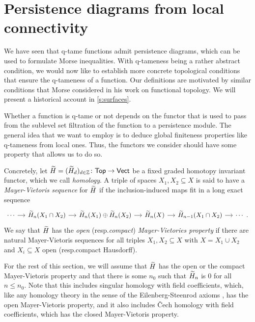 
\section{Persistence diagrams from local connectivity} \label{s:connectivity}

We have seen that q-tame functions admit persistence diagrams, which can be used to formulate Morse inequalities. With q-tameness being a rather abstract condition, we would now like to establish more concrete topological conditions that ensure the q-tameness of a function. Our definitions are motivated by similar conditions that Morse considered in his work on functional topology. We will present a historical account in \cref{s:surfaces}.

Whether a function is q-tame or not depends on the functor that is used to pass from the sublevel set filtration of the function to a persistence module. The general idea that we want to employ is to deduce global finiteness properties like q-tameness from local ones. Thus, the functors we consider should have some property that allows us to do so.

Concretely, let $\widetilde{H} = (\widetilde{H}_d)_{d \in \mathbb{Z}} \colon \mathsf{Top} \to \mathsf{Vect}$ be a fixed graded homotopy invariant functor, which we call \emph{homology}.
A triple of spaces $X_{1}, X_{2} \subseteq X$ is said to have a \emph{Mayer-Vietoris sequence} for $\widetilde{H}$ if the inclusion-induced maps fit in a long exact sequence
 \[
\begin{tikzcd}[column sep = small]
\cdots \arrow[r] & \H_{n}(X_{1} \cap X_{2}) \arrow[r] & \H_{n}(X_{1}) \oplus \H_{n}(X_{2}) \arrow[r] & \H_{n}(X) \arrow[r] & \H_{n-1}(X_{1} \cap X_{2}) \arrow[r] & \cdots \ .
\end{tikzcd}
\]
We say that $\widetilde{H}$ has the \emph{open} (resp.\@ \emph{compact}) \emph{Mayer-Vietories property} if there are natural Mayer-Vietoris sequences for all triples $X_{1}, X_{2} \subseteq X$ with $X = X_1 \cup X_2$ and $X_i \subseteq X$ open (resp.\@ compact Hausdorff). 

For the rest of this section, we will assume that $\widetilde{H}$ has the open or the compact Mayer-Vietoris property and that there is some $n_0$ such that $\widetilde{H}_{n}$ is 0 for all $n \leq n_0$. 
Note that this includes singular homology with field coefficients, which, like any homology theory in the sense of the Eilenberg-Steenrod axioms \cite[Section I]{MR0050886}, has the open Mayer-Vietoris property, and it also includes \v{C}ech homology with field coefficients, which has the closed Mayer-Vietoris property.

